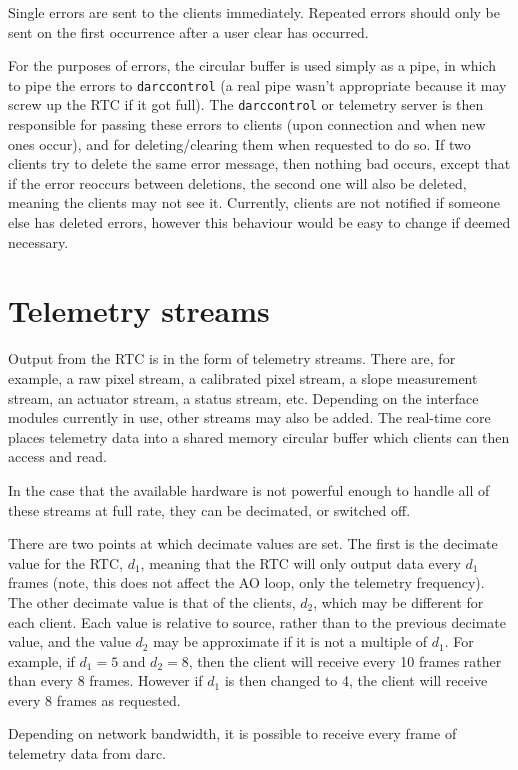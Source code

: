 \documentclass[a4,10pt]{article}
\begin{document}
Single errors are sent to the clients immediately.  Repeated errors
should only be sent on the first occurrence after a user clear has
occurred.  

For the purposes of errors, the circular buffer is used simply as a
pipe, in which to pipe the errors to {\tt darccontrol} (a real pipe wasn't
appropriate because it may screw up the RTC if it got full).  The
{\tt darccontrol} or telemetry server is then responsible for passing these
errors to clients (upon connection and when new ones occur), and for
deleting/clearing them when requested to do so.  If two clients try to
delete the same error message, then nothing bad occurs, except that if
the error reoccurs between deletions, the second one will also be
deleted, meaning the clients may not see it.  Currently, clients are
not notified if someone else has deleted errors, however this
behaviour would be easy to change if deemed necessary.

\section{Telemetry streams}
Output from the RTC is in the form of telemetry streams.  There are,
for example, a raw pixel stream, a calibrated pixel stream, a slope
measurement stream, an actuator stream, a status stream, etc.
Depending on the interface modules currently in use, other streams may
also be added.  The real-time core places telemetry data into a shared
memory circular buffer which clients can then access and read.

In the case that the available hardware is not powerful enough to
handle all of these streams at full rate, they can be decimated, or
switched off.

There are two points at which decimate values are set.  The first is
the decimate value for the RTC, $d_1$, meaning that the RTC will only
output data every $d_1$ frames (note, this does not affect the AO
loop, only the telemetry frequency).  The other decimate value is that
of the clients, $d_2$, which may be different for each client.  Each value is relative to source, rather than to the
previous decimate value, and the value $d_2$ may be
approximate if it is not a multiple of $d_1$.  For example, if $d_1=5$
and $d_2=8$, then the client will receive every 10 frames rather than
every 8 frames.  However if $d_1$ is then changed to 4, the client
will receive every 8 frames as requested.

Depending on network bandwidth, it is possible to receive every frame
of telemetry data from darc.
\end{document}
